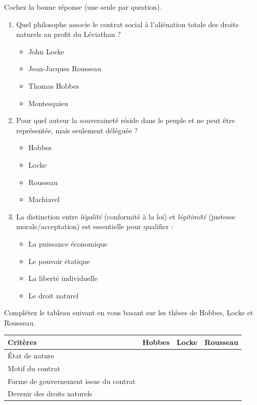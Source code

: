 \documentclass[11pt]{article}
\begin{document}
\begin{exercice}
Cochez la bonne réponse (une seule par question).
\begin{enumerate}
    \item Quel philosophe associe le contrat social à l'aliénation totale des droits naturels au profit du Léviathan ?
    \begin{itemize}
        \item[$\square$] John Locke
        \item[$\square$] Jean-Jacques Rousseau
        \item[$\square$] Thomas Hobbes
        \item[$\square$] Montesquieu
    \end{itemize}
    \item Pour quel auteur la souveraineté réside dans le peuple et ne peut être représentée, mais seulement déléguée ?
    \begin{itemize}
        \item[$\square$] Hobbes
        \item[$\square$] Locke
        \item[$\square$] Rousseau
        \item[$\square$] Machiavel
    \end{itemize}
    \item La distinction entre \textit{légalité} (conformité à la loi) et \textit{légitimité} (justesse morale/acceptation) est essentielle pour qualifier :
    \begin{itemize}
        \item[$\square$] La puissance économique
        \item[$\square$] Le pouvoir étatique
        \item[$\square$] La liberté individuelle
        \item[$\square$] Le droit naturel
    \end{itemize}
\end{enumerate}
\end{exercice}

\begin{exercice}
Complétez le tableau suivant en vous basant sur les thèses de Hobbes, Locke et Rousseau.

\begin{tabularx}{\linewidth}{|X|c|c|c|}
\hline
\textbf{Critères} & \textbf{Hobbes} & \textbf{Locke} & \textbf{Rousseau} \\
\hline
État de nature & & & \\
\hline
Motif du contrat & & & \\
\hline
Forme de gouvernement issue du contrat & & & \\
\hline
Devenir des droits naturels & & & \\
\hline
\end{tabularx}
\end{exercice}
\end{document}
